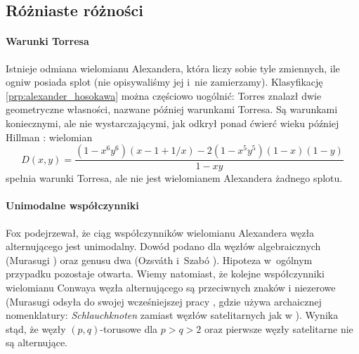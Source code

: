 
\subsection{Różniaste różności}
\paragraph{Warunki Torresa}
Istnieje odmiana wielomianu Alexandera, która liczy sobie tyle zmiennych, ile ogniw posiada splot (nie opisywaliśmy jej i~nie zamierzamy).
Klasyfikację \ref{prp:alexander_hosokawa} można częściowo uogólnić: Torres \cite{torres1953} znalazł dwie geometryczne własności, nazwane później warunkami Torresa.
%
%
Są warunkami koniecznymi, ale nie wystarczającymi, jak odkrył ponad ćwierć wieku później Hillman \cite{hillman1981}: wielomian
%
\begin{equation}
    D(x,y) = \frac{(1 - x^6y^6)(x - 1 + 1/x) - 2(1 - x^5y^5)(1 - x)(1 - y)}{1-xy}
\end{equation}
spełnia warunki Torresa, ale nie jest wielomianem Alexandera żadnego splotu.

\paragraph{Unimodalne współczynniki}
Fox \cite{fox1962} podejrzewał, że
%
%
ciąg współczynników wielomianu Alexandera węzła alternującego jest unimodalny.
Dowód podano dla węzłów algebraicznych (Murasugi \cite{murasugi1985}) oraz genusu dwa (Ozsváth i~Szabó \cite{ozsvath2003}).
%
%
%
Hipoteza w~ogólnym przypadku pozostaje otwarta.
Wiemy natomiast, że kolejne współczynniki wielomianu Conwaya węzła alternującego są przeciwnych znaków i niezerowe (Murasugi \cite[s. 242]{murasugi1996} odsyła do swojej wcześniejszej pracy \cite{murasugi1959}, gdzie używa archaicznej nomenklatury: \emph{Schlauchknoten} zamiast węzłów satelitarnych jak w \cite[s. 245]{schubert1953}).
%
Wynika stąd, że węzły $(p, q)$-torusowe dla $p > q > 2$ oraz pierwsze węzły satelitarne nie są alternujące.


